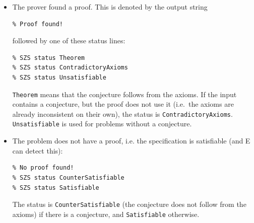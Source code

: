 \documentclass{report}
\begin{document}
\begin{itemize}
\item The prover found a proof. This is denoted by the output string
\begin{verbatim}
% Proof found!
\end{verbatim}
  followed by one of these status lines:
\begin{verbatim}
% SZS status Theorem
% SZS status ContradictoryAxioms
% SZS status Unsatisfiable
\end{verbatim}
  \texttt{Theorem} means that the conjecture follows from the
  axioms. If the input contains a conjecture, but the proof does not
  use it (i.e.\ the axioms are already inconsistent on their own), the
  status is \texttt{ContradictoryAxioms}. \texttt{Unsatisfiable} is
  used for problems without a conjecture.
\item The problem does not have a proof, i.e. the specification is
  satisfiable (and E can detect this):
\begin{verbatim}
% No proof found!
% SZS status CounterSatisfiable
% SZS status Satisfiable
\end{verbatim}
  The status is \texttt{CounterSatisfiable} (the conjecture does not
  follow from the axioms) if there is a conjecture, and
  \texttt{Satisfiable} otherwise.


\end{itemize}
\end{document}

